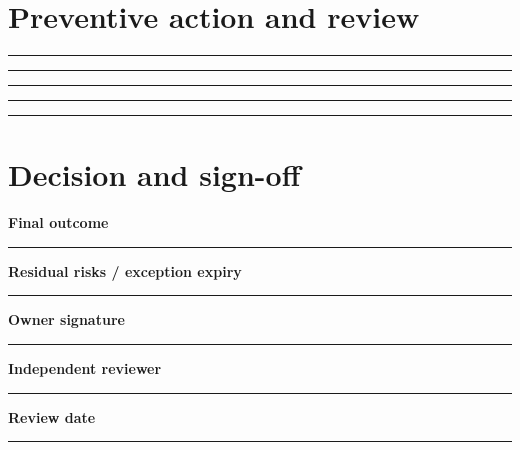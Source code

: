 \documentclass[11pt,letterpaper]{article}
\begin{document}
\section{Preventive action and review}
\vspace{2mm}
\noindent\rule{0.93\linewidth}{0.4pt}\par\vspace{13pt}
\noindent\rule{0.93\linewidth}{0.4pt}\par\vspace{13pt}
\noindent\rule{0.93\linewidth}{0.4pt}\par\vspace{13pt}
\noindent\rule{0.93\linewidth}{0.4pt}\par\vspace{13pt}
\noindent\rule{0.93\linewidth}{0.4pt}\par\vspace{13pt}
\section{Decision and sign-off}
\noindent\textbf{Final outcome}\par\nobreak\vspace{6pt}\noindent\rule{0.93\linewidth}{0.4pt}\par\vspace{14pt}
\noindent\textbf{Residual risks / exception expiry}\par\nobreak\vspace{6pt}\noindent\rule{0.93\linewidth}{0.4pt}\par\vspace{14pt}
\noindent\textbf{Owner signature}\par\nobreak\vspace{6pt}\noindent\rule{0.93\linewidth}{0.4pt}\par\vspace{14pt}
\noindent\textbf{Independent reviewer}\par\nobreak\vspace{6pt}\noindent\rule{0.93\linewidth}{0.4pt}\par\vspace{14pt}
\noindent\textbf{Review date}\par\nobreak\vspace{6pt}\noindent\rule{0.93\linewidth}{0.4pt}\par\vspace{14pt}
\end{document}
